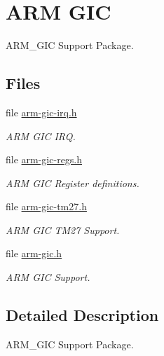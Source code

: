 \hypertarget{group__arm__gic}{}\section{A\+RM G\+IC}
\label{group__arm__gic}


A\+R\+M\+\_\+\+G\+IC Support Package.  


\subsection*{Files}
\begin{DoxyCompactItemize}
\item 
file \mbox{\hyperlink{arm-gic-irq_8h}{arm-\/gic-\/irq.\+h}}
\begin{DoxyCompactList}\small\item\em A\+RM G\+IC I\+RQ. \end{DoxyCompactList}\item 
file \mbox{\hyperlink{arm-gic-regs_8h}{arm-\/gic-\/regs.\+h}}
\begin{DoxyCompactList}\small\item\em A\+RM G\+IC Register definitions. \end{DoxyCompactList}\item 
file \mbox{\hyperlink{arm-gic-tm27_8h}{arm-\/gic-\/tm27.\+h}}
\begin{DoxyCompactList}\small\item\em A\+RM G\+IC T\+M27 Support. \end{DoxyCompactList}\item 
file \mbox{\hyperlink{arm-gic_8h}{arm-\/gic.\+h}}
\begin{DoxyCompactList}\small\item\em A\+RM G\+IC Support. \end{DoxyCompactList}\end{DoxyCompactItemize}


\subsection{Detailed Description}
A\+R\+M\+\_\+\+G\+IC Support Package. 

